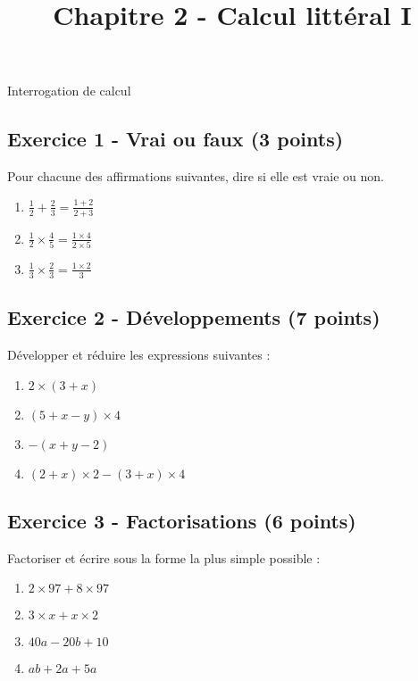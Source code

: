\documentclass[14 pt]{extarticle}
\title{Chapitre 2 -  Calcul littéral I}
\date{}
\theoremstyle{plain}
\begin{document}
\begin{center}{\Large Interrogation de calcul}\\ 
 \end{center}


\subsection*{Exercice 1 - Vrai ou faux (3 points)}

Pour chacune des affirmations suivantes, dire si elle est vraie ou non. 

\begin{enumerate}
\item $\frac{1}{2} + \frac{2}{3} = \frac{1+2}{2+3}$

\item $\frac{1}{2} \times \frac{4}{5} = \frac{1\times4}{2\times5}$

\item $\frac{1}{3} \times\frac{2}{3} = \frac{1\times 2}{3}$

\end{enumerate}

\subsection*{Exercice 2 - Développements (7 points)}

Développer et réduire les expressions suivantes : 

\begin{enumerate}
\item $2\times (3 + x) $
\item $(5 + x - y) \times 4$
\item $-(x+y-2)$
\item $(2 + x) \times 2 - (3+ x) \times 4$

\end{enumerate}


\subsection*{Exercice 3 - Factorisations (6 points)}

Factoriser et écrire sous la forme la plus simple possible : 
\begin{enumerate}
\item $2\times 97 + 8 \times 97$ 
\item $3\times x + x \times 2$ 
\item $ 40 a - 20 b + 10$
\item $ ab + 2a + 5a$
\end{enumerate}
\end{document}
